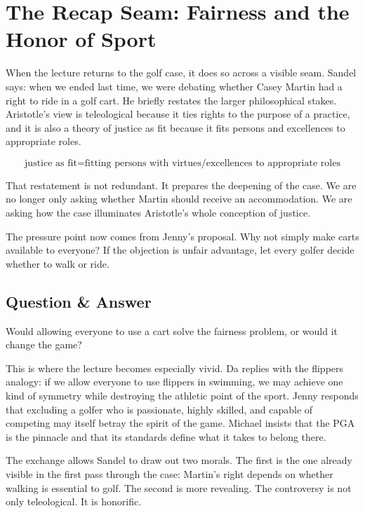 \section{The Recap Seam: Fairness and the Honor of Sport}

When the lecture returns to the golf case, it does so across a visible seam. Sandel says: when we ended last time, we were debating whether Casey Martin had a right to ride in a golf cart. He briefly restates the larger philosophical stakes. Aristotle's view is teleological because it ties rights to the purpose of a practice, and it is also a theory of justice as fit because it fits persons and excellences to appropriate roles.

\begin{equation}
\text{justice as fit}
=
\text{fitting persons with virtues/excellences to appropriate roles}
\end{equation}

That restatement is not redundant. It prepares the deepening of the case. We are no longer only asking whether Martin should receive an accommodation. We are asking how the case illuminates Aristotle's whole conception of justice.

The pressure point now comes from Jenny's proposal. Why not simply make carts available to everyone? If the objection is unfair advantage, let every golfer decide whether to walk or ride.

\subsection{Question \& Answer}

Would allowing everyone to use a cart solve the fairness problem, or would it change the game?

This is where the lecture becomes especially vivid. Da replies with the flippers analogy: if we allow everyone to use flippers in swimming, we may achieve one kind of symmetry while destroying the athletic point of the sport. Jenny responds that excluding a golfer who is passionate, highly skilled, and capable of competing may itself betray the spirit of the game. Michael insists that the PGA is the pinnacle and that its standards define what it takes to belong there.

The exchange allows Sandel to draw out two morals. The first is the one already visible in the first pass through the case: Martin's right depends on whether walking is essential to golf. The second is more revealing. The controversy is not only teleological. It is honorific.

